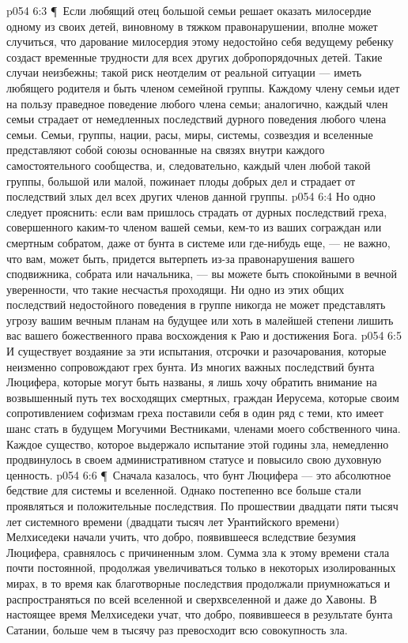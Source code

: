 \vs p054 6:3 \P\ Если любящий отец большой семьи решает оказать милосердие одному из своих детей, виновному в тяжком правонарушении, вполне может случиться, что дарование милосердия этому недостойно себя ведущему ребенку создаст временные трудности для всех других добропорядочных детей. Такие случаи неизбежны; такой риск неотделим от реальной ситуации --- иметь любящего родителя и быть членом семейной группы. Каждому члену семьи идет на пользу праведное поведение любого члена семьи; аналогично, каждый член семьи страдает от немедленных последствий дурного поведения любого члена семьи. Семьи, группы, нации, расы, миры, системы, созвездия и вселенные представляют собой союзы основанные на связях внутри каждого самостоятельного сообщества, и, следовательно, каждый член любой такой группы, большой или малой, пожинает плоды добрых дел и страдает от последствий злых дел всех других членов данной группы.
\vs p054 6:4 Но одно следует прояснить: если вам пришлось страдать от дурных последствий греха, совершенного каким\hyp{}то членом вашей семьи, кем\hyp{}то из ваших сограждан или смертным собратом, даже от бунта в системе или где\hyp{}нибудь еще, --- не важно, что вам, может быть, придется вытерпеть из\hyp{}за правонарушения вашего сподвижника, собрата или начальника, --- вы можете быть спокойными в вечной уверенности, что такие несчастья проходящи. Ни одно из этих общих последствий недостойного поведения в группе никогда не может представлять угрозу вашим вечным планам на будущее или хоть в малейшей степени лишить вас вашего божественного права восхождения к Раю и достижения Бога.
\vs p054 6:5 И существует воздаяние за эти испытания, отсрочки и разочарования, которые неизменно сопровождают грех бунта. Из многих важных последствий бунта Люцифера, которые могут быть названы, я лишь хочу обратить внимание на возвышенный путь тех восходящих смертных, граждан Иерусема, которые своим сопротивлением софизмам греха поставили себя в один ряд с теми, кто имеет шанс стать в будущем Могучими Вестниками, членами моего собственного чина. Каждое существо, которое выдержало испытание этой годины зла, немедленно продвинулось в своем административном статусе и повысило свою духовную ценность.
\vs p054 6:6 \P\ Сначала казалось, что бунт Люцифера --- это абсолютное бедствие для системы и вселенной. Однако постепенно все больше стали проявляться и положительные последствия. По прошествии двадцати пяти тысяч лет системного времени (двадцати тысяч лет Урантийского времени) Мелхиседеки начали учить, что добро, появившееся вследствие безумия Люцифера, сравнялось с причиненным злом. Сумма зла к этому времени стала почти постоянной, продолжая увеличиваться только в некоторых изолированных мирах, в то время как благотворные последствия продолжали приумножаться и распространяться по всей вселенной и сверхвселенной и даже до Хавоны. В настоящее время Мелхиседеки учат, что добро, появившееся в результате бунта Сатании, больше чем в тысячу раз превосходит всю совокупность зла.
